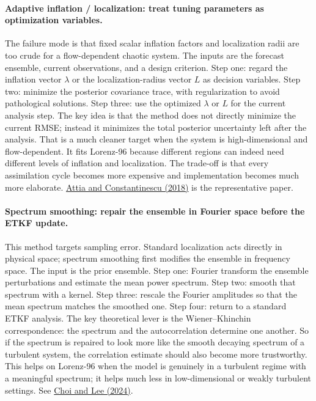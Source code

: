 \documentclass[12pt,a4paper]{article}
\begin{document}
\paragraph{Adaptive inflation / localization: treat tuning parameters as optimization variables.}
The failure mode is that fixed scalar inflation factors and localization radii are too crude for a flow-dependent chaotic system. The inputs are the forecast ensemble, current observations, and a design criterion. Step one: regard the inflation vector \(\lambda\) or the localization-radius vector \(L\) as decision variables. Step two: minimize the posterior covariance trace, with regularization to avoid pathological solutions. Step three: use the optimized \(\lambda\) or \(L\) for the current analysis step. The key idea is that the method does not directly minimize the current RMSE; instead it minimizes the total posterior uncertainty left after the analysis. That is a much cleaner target when the system is high-dimensional and flow-dependent. It fits Lorenz-96 because different regions can indeed need different levels of inflation and localization. The trade-off is that every assimilation cycle becomes more expensive and implementation becomes much more elaborate. \href{https://arxiv.org/abs/1806.10655}{Attia and Constantinescu (2018)} is the representative paper.

\paragraph{Spectrum smoothing: repair the ensemble in Fourier space before the ETKF update.}
This method targets sampling error. Standard localization acts directly in physical space; spectrum smoothing first modifies the ensemble in frequency space. The input is the prior ensemble. Step one: Fourier transform the ensemble perturbations and estimate the mean power spectrum. Step two: smooth that spectrum with a kernel. Step three: rescale the Fourier amplitudes so that the mean spectrum matches the smoothed one. Step four: return to a standard ETKF analysis. The key theoretical lever is the Wiener--Khinchin correspondence: the spectrum and the autocorrelation determine one another. So if the spectrum is repaired to look more like the smooth decaying spectrum of a turbulent system, the correlation estimate should also become more trustworthy. This helps on Lorenz-96 when the model is genuinely in a turbulent regime with a meaningful spectrum; it helps much less in low-dimensional or weakly turbulent settings. See \href{https://arxiv.org/abs/2404.00154}{Choi and Lee (2024)}.
\end{document}
